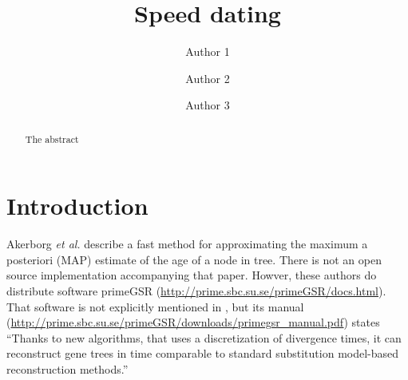 \documentclass{llncs}
\newcommand{\etal}[0]{{\em et al.}\xspace}
\begin{document}
\title{Speed dating}
\author{Author 1 \and Author 2 \and Author 3}
\newcommand\enum{\addtocounter{equation}{1}\tag{\theequation}}
\maketitle              %
\begin{abstract} The abstract \end{abstract}
\section {Introduction}
Akerborg \etal \cite{Akerborg2008} describe a fast method for approximating
the maximum a posteriori (MAP) estimate of the age of a node in tree.
There is not an open source implementation accompanying that paper.
Howver, these authors do distribute software primeGSR
(\url{http://prime.sbc.su.se/primeGSR/docs.html}).
That software is not explicitly mentioned in \cite{Akerborg2008}, but its manual
(\url{http://prime.sbc.su.se/primeGSR/downloads/primegsr_manual.pdf})
states ``Thanks to
new algorithms, that uses a discretization of divergence times, it can reconstruct gene trees
in time comparable to standard substitution model-based reconstruction methods.''
\end{document}
